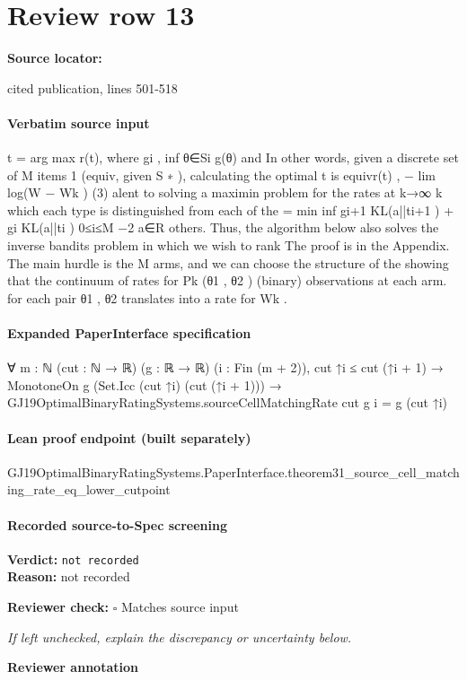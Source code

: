 \documentclass[10pt]{article}
\newcommand{\reviewerbox}{%
  \par\noindent\fbox{\parbox{0.96\linewidth}{\rule{0pt}{0.38in}}}\par
}
\newcommand{\reviewmatch}[1]{%
  \par\noindent\textbf{Reviewer check:} $\square$\; #1\par
  \noindent\emph{If left unchecked, explain the discrepancy or uncertainty below.}\par
}
\begin{document}
\section*{Review row 13}
\textbf{Source locator:} {\footnotesize\raggedright cited publication, lines 501-\allowbreak{}518\par}
\paragraph{Verbatim source input}
\begin{ReviewVerbatim}
t = arg max r(t), where gi , inf θ∈Si g(θ) and
In other words, given a discrete set of M items
1
(equiv, given S ∗ ), calculating the optimal t is equivr(t) , − lim log(W − Wk )
(3)
alent to solving a maximin problem for the rates at
k→∞ k
which
each type is distinguished from each of the
= min inf {gi+1 KL(a||ti+1 ) + gi KL(a||ti )}
0≤i≤M −2 a∈R
others. Thus, the algorithm below also solves the
inverse bandits problem in which we wish to rank
The proof is in the Appendix. The main hurdle is
the M arms, and we can choose the structure of the
showing that the continuum of rates for Pk (θ1 , θ2 )
(binary) observations at each arm.
for each pair θ1 , θ2 translates into a rate for Wk .
\end{ReviewVerbatim}


\paragraph{Expanded PaperInterface specification}
\begin{ReviewVerbatim}
∀ {m : ℕ} (cut : ℕ → ℝ) (g : ℝ → ℝ) (i : Fin (m + 2)),
  cut ↑i ≤ cut (↑i + 1) →
    MonotoneOn g (Set.Icc (cut ↑i) (cut (↑i + 1))) →
      GJ19OptimalBinaryRatingSystems.sourceCellMatchingRate cut g i = g (cut ↑i)
\end{ReviewVerbatim}

\paragraph{Lean proof endpoint (built separately)}\begin{ReviewVerbatim}
GJ19OptimalBinaryRatingSystems.PaperInterface.theorem31_source_cell_matching_rate_eq_lower_cutpoint
\end{ReviewVerbatim}

\paragraph{Recorded source-to-Spec screening}
\textbf{Verdict:} \texttt{not recorded}
\\
\textbf{Reason:} not recorded
\reviewmatch{Matches source input}
\noindent\textbf{Reviewer annotation}\par
\reviewerbox
\clearpage
\hypertarget{source-claim-74286919e0e8cecc}{}
\end{document}
